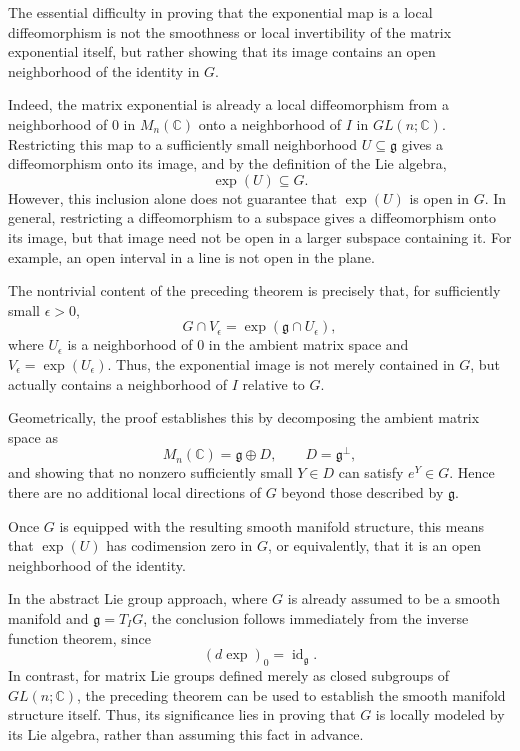 \documentclass[../main.tex]{subfiles}
\begin{document}
\begin{remark}
  The essential difficulty in proving that the exponential map is a local diffeomorphism is not the smoothness or local invertibility of the matrix exponential itself, but rather showing that its image contains an open neighborhood of the identity in $G$.

  Indeed, the matrix exponential is already a local diffeomorphism from a neighborhood of $0$ in $M_n(\mathbb{C})$ onto a neighborhood of $I$ in $GL(n;\mathbb{C})$. Restricting this map to a sufficiently small neighborhood $U\subseteq\mathfrak{g}$ gives a diffeomorphism onto its image, and by the definition of the Lie algebra,
  \begin{equation}
    \exp(U)\subseteq G.
  \end{equation}
  However, this inclusion alone does not guarantee that $\exp(U)$ is open in $G$. In general, restricting a diffeomorphism to a subspace gives a diffeomorphism onto its image, but that image need not be open in a larger subspace containing it. For example, an open interval in a line is not open in the plane.

  The nontrivial content of the preceding theorem is precisely that, for sufficiently small $\epsilon>0$,
  \begin{equation}
    \boxed{
      G\cap V_\epsilon
      =\exp(\mathfrak{g}\cap U_\epsilon),
    }
  \end{equation}
  where $U_\epsilon$ is a neighborhood of $0$ in the ambient matrix space and $V_\epsilon=\exp(U_\epsilon)$. Thus, the exponential image is not merely contained in $G$, but actually contains a neighborhood of $I$ relative to $G$.

  Geometrically, the proof establishes this by decomposing the ambient matrix space as
  \begin{equation}
    M_n(\mathbb{C})=\mathfrak{g}\oplus D,
    \qquad D=\mathfrak{g}^{\perp},
  \end{equation}
  and showing that no nonzero sufficiently small $Y\in D$ can satisfy $e^Y\in G$. Hence there are no additional local directions of $G$ beyond those described by $\mathfrak{g}$.

  Once $G$ is equipped with the resulting smooth manifold structure, this means that $\exp(U)$ has codimension zero in $G$, or equivalently, that it is an open neighborhood of the identity.

  In the abstract Lie group approach, where $G$ is already assumed to be a smooth manifold and $\mathfrak{g}=T_I G$, the conclusion follows immediately from the inverse function theorem, since
  \begin{equation}
    (d\exp)_0=\operatorname{id}_{\mathfrak{g}}.
  \end{equation}
  In contrast, for matrix Lie groups defined merely as closed subgroups of $GL(n;\mathbb{C})$, the preceding theorem can be used to establish the smooth manifold structure itself. Thus, its significance lies in proving that $G$ is locally modeled by its Lie algebra, rather than assuming this fact in advance.
\end{remark}
\end{document}
